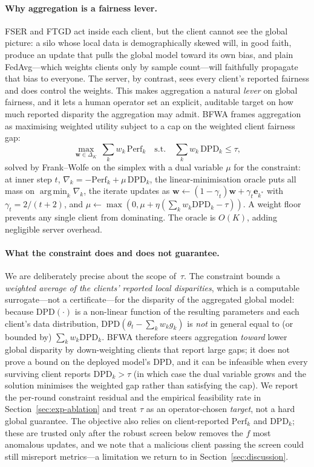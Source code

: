 \documentclass[pdflatex,sn-mathphys-num]{sn-jnl}
\theoremstyle{thmstyleone}%
\theoremstyle{thmstyletwo}%
\theoremstyle{thmstylethree}%
\newcommand{\dpd}{\mathrm{DPD}}
\DeclareMathOperator*{\argmin}{arg\,min}
\begin{document}
\paragraph{Why aggregation is a fairness lever.}
FSER and FTGD act inside each client, but the client cannot see the global
picture: a silo whose local data is demographically skewed will, in good faith,
produce an update that pulls the global model toward its own bias, and plain
FedAvg---which weights clients only by sample count---will faithfully propagate
that bias to everyone. The server, by contrast, sees every client's reported
fairness and does control the weights. This makes aggregation a natural
\emph{lever} on global fairness, and it lets a human operator set an explicit,
auditable target on how much reported disparity the aggregation may admit. BFWA
frames aggregation as maximising weighted utility subject to a cap on the
weighted client fairness gap:
\begin{equation}
\max_{\mathbf{w}\in\Delta_K}\ \textstyle\sum_k w_k\,\mathrm{Perf}_k
\quad\text{s.t.}\quad \textstyle\sum_k w_k\,\dpd_k\le\tau,
\end{equation}
solved by Frank--Wolfe on the simplex with a dual variable $\mu$ for the
constraint: at inner step $t$, $\nabla_k=-\mathrm{Perf}_k+\mu\,\dpd_k$, the
linear-minimisation oracle puts all mass on $\argmin_k\nabla_k$, the iterate
updates as $\mathbf{w}\!\leftarrow\!(1-\gamma_t)\mathbf{w}+\gamma_t\mathbf{e}_{k^*}$
with $\gamma_t=2/(t+2)$, and $\mu\!\leftarrow\!\max(0,\mu+\eta(\sum_k w_k\dpd_k-\tau))$.
A weight floor prevents any single client from dominating. The oracle is $O(K)$,
adding negligible server overhead.

\paragraph{What the constraint does and does not guarantee.}
We are deliberately precise about the scope of~$\tau$. The constraint bounds a
\emph{weighted average of the clients' reported local disparities}, which is a
computable surrogate---not a certificate---for the disparity of the aggregated
global model: because $\dpd(\cdot)$ is a non-linear function of the resulting
parameters and each client's data distribution, $\dpd(\theta_t-\sum_k w_k g_k)$
is \emph{not} in general equal to (or bounded by) $\sum_k w_k\dpd_k$. BFWA
therefore steers aggregation \emph{toward} lower global disparity by
down-weighting clients that report large gaps; it does not prove a bound on the
deployed model's DPD, and it can be infeasible when every surviving client
reports $\dpd_k>\tau$ (in which case the dual variable grows and the solution
minimises the weighted gap rather than satisfying the cap). We report the
per-round constraint residual and the empirical feasibility rate in
Section~\ref{sec:exp-ablation} and treat $\tau$ as an operator-chosen
\emph{target}, not a hard global guarantee. The objective also relies on
client-reported $\mathrm{Perf}_k$ and $\dpd_k$; these are trusted only after the
robust screen below removes the $f$ most anomalous updates, and we note that a
malicious client passing the screen could still misreport metrics---a limitation
we return to in Section~\ref{sec:discussion}.
\end{document}
